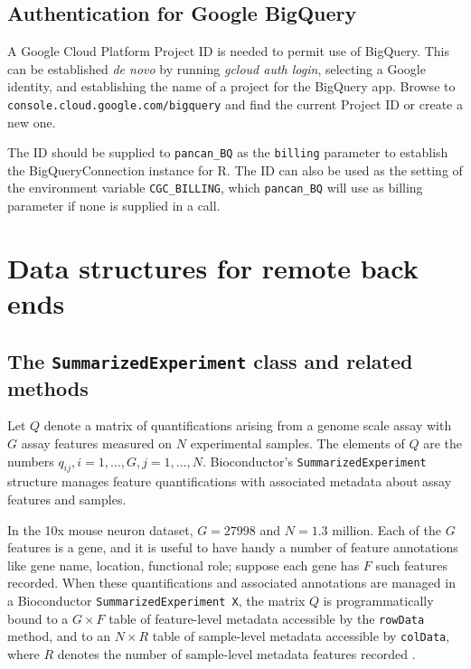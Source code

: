 \documentclass[applications]{gen-bioinformatics}
\begin{document}
\subsection*{Authentication for Google BigQuery}

A Google Cloud Platform Project ID is needed to
permit use of BigQuery.  This can be established \textit{de novo}
by running \textit{gcloud auth login}, selecting a Google
identity, and establishing the name of a project for
the BigQuery app.  Browse to \texttt{console.cloud.google.com/bigquery}
and find the current Project ID or create a new one.

The ID should be supplied to \verb+pancan_BQ+ as the
\texttt{billing} parameter to establish the BigQueryConnection
instance for R.  The ID can also be used as the setting
of the environment variable \verb+CGC_BILLING+, which
\verb+pancan_BQ+ will use as billing parameter if none
is supplied in a call.


\section*{Data structures for remote back ends}

\subsection*{The \texttt{SummarizedExperiment} class and related methods}

Let $Q$ denote a matrix of quantifications arising from a genome
scale assay with $G$ assay features measured on $N$ experimental
samples.  The elements of $Q$ are the numbers $q_{ij}, i = 1, \ldots, G,
j = 1, \ldots, N$.  Bioconductor's \texttt{SummarizedExperiment} structure
manages feature quantifications
with associated metadata about assay features
and samples.

In the 10x mouse neuron dataset, $G=27998$ and $N=1.3$ million.
Each of the $G$ features is a gene, and it is useful to
have handy a number of feature annotations like gene name,
location, functional role; suppose each gene has $F$ such
features recorded.
When these quantifications and
associated annotations are managed in a 
Bioconductor \texttt{SummarizedExperiment X}, the matrix $Q$ is programmatically bound to a $G \times F$
table of feature-level metadata
accessible by the \texttt{rowData} method, and to an $N \times R$ table of sample-level metadata accessible by \texttt{colData},
where $R$ denotes the number of sample-level metadata
features recorded \citep{Huber2015}. 
\end{document}
